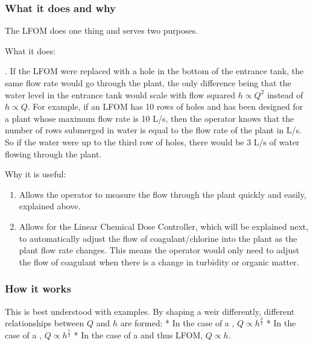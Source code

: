 \documentclass[letterpaper,10pt,english]{sphinxmanual}
\begin{document}
\subsubsection{What it does and why}
\label{\detokenize{Flow_Control_and_Measurement/FCM_Design:id2}}
The LFOM does one thing and serves two purposes.

What it does:

 . If the LFOM were replaced with a hole in the bottom of the entrance tank, the same flow rate would go through the plant, the only difference being that the water level in the entrance tank would scale with flow squared \(h \propto Q^2\) instead of \(h \propto Q\). For example, if an LFOM has 10 rows of holes and has been designed for a plant whose maximum flow rate is 10 L/s, then the operator knows that the number of rows submerged in water is equal to the flow rate of the plant in L/s. So if the water were up to the third row of holes, there would be 3 L/s of water flowing through the plant.

Why it is useful:
\begin{enumerate}
\item {} 
Allows the operator to measure the flow through the plant quickly and easily, explained above.

\item {} 
Allows for the Linear Chemical Dose Controller, which will be explained next, to automatically adjust the flow of coagulant/chlorine into the plant as the plant flow rate changes. This means the operator would only need to adjust the flow of coagulant when there is a change in turbidity or organic matter.

\end{enumerate}


\subsubsection{How it works}
\label{\detokenize{Flow_Control_and_Measurement/FCM_Design:id3}}
This is best understood with examples. By shaping a weir differently, different relationships between \(Q\) and \(h\) are formed:
* In the case of a , \(Q \propto h^{\frac{3}{2}}\)
* In the case of a , \(Q \propto h^{\frac{5}{2}}\)
* In the case of a  and thus LFOM, \(Q \propto h\).
\end{document}
